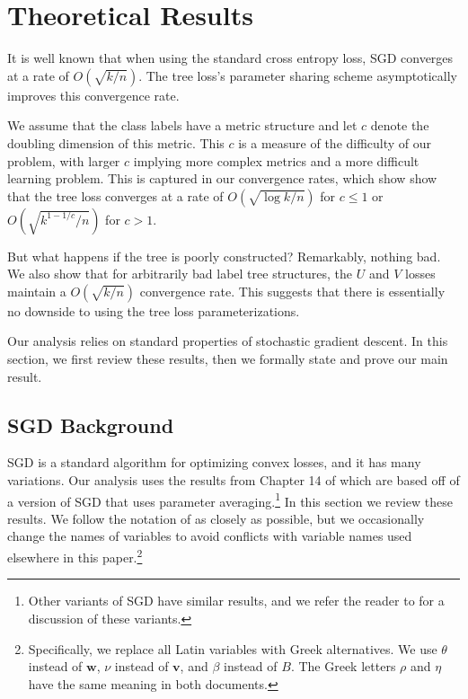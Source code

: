 \documentclass[twoside]{article}
\newcommand{\vv}{\mathbf v}
\newcommand{\w}{\mathbf w}
\begin{document}
\clearpage
\appendix

\section{Theoretical Results}
\label{sec:theory}

It is well known that when using the standard cross entropy loss,
SGD converges at a rate of $O(\sqrt{k/n})$.
The tree loss's parameter sharing scheme asymptotically improves this convergence rate.

We assume that the class labels have a metric structure and let $c$ denote the doubling dimension of this metric.
This $c$ is a measure of the difficulty of our problem,
with larger $c$ implying more complex metrics and a more difficult learning problem.
This is captured in our convergence rates,
which show show that the tree loss converges at a rate of $O(\sqrt{\log k/n})$ for $c\le1$ or $O(\sqrt{k^{1-1/c}/n})$ for $c>1$.

But what happens if the tree is poorly constructed?
Remarkably, nothing bad.
We also show that for arbitrarily bad label tree structures,
the $U$ and $V$ losses maintain a $O(\sqrt{k/n})$ convergence rate.
This suggests that there is essentially no downside to using the tree loss parameterizations.

Our analysis relies on standard properties of stochastic gradient descent.
In this section, we first review these results,
then we formally state and prove our main result.

\subsection{SGD Background}

SGD is a standard algorithm for optimizing convex losses,
and it has many variations.
Our analysis uses the results from Chapter 14 of \citet{shalev2014understanding} which are based off of a version of SGD that uses parameter averaging.\footnote{
Other variants of SGD have similar results,
and we refer the reader to \citet{shalev2014understanding} for a discussion of these variants.}
In this section we review these results.
We follow the notation of \citet{shalev2014understanding} as closely as possible,
but we occasionally change the names of variables to avoid conflicts with variable names used elsewhere in this paper.\footnote{
    Specifically, we replace all Latin variables with Greek alternatives.
    We use $\theta$ instead of $\w$, $\nu$ instead of $\vv$, and $\beta$ instead of $B$.
    The Greek letters $\rho$ and $\eta$ have the same meaning in both documents.
}
\end{document}
